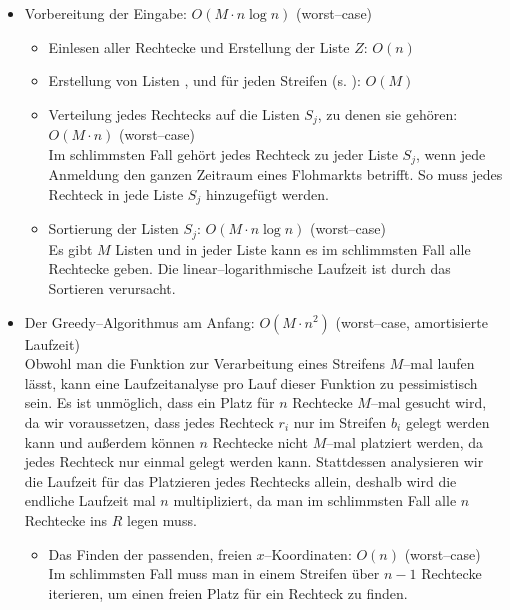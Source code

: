 \begin{itemize}
	\item Vorbereitung der Eingabe: $O(M \cdot n \log n)$ (worst--case)
	\begin{itemize}
		\item Einlesen aller Rechtecke und Erstellung der Liste $Z$: $O(n)$

		\item Erstellung von Listen ,  und 
		für jeden Streifen (s. ): $O(M)$

		\item Verteilung jedes Rechtecks auf die Listen $S_j$, zu denen sie gehören: $O(M \cdot n)$ (worst--case)\\
		Im schlimmsten Fall gehört jedes Rechteck zu jeder Liste $S_j$, wenn jede Anmeldung
		den ganzen Zeitraum eines Flohmarkts betrifft.
		So muss jedes Rechteck in jede Liste $S_j$ hinzugefügt werden.

		\item Sortierung der Listen $S_j$: $O(M \cdot n \log n)$ (worst--case)\\
		Es gibt $M$ Listen und in jeder Liste kann es im schlimmsten Fall
		alle Rechtecke geben. Die linear--logarithmische Laufzeit
		ist durch das Sortieren verursacht.
	\end{itemize}

	\item Der Greedy--Algorithmus am Anfang: $O(M \cdot n^2)$ (worst--case, amortisierte Laufzeit)\\
	Obwohl man die Funktion zur Verarbeitung eines Streifens $M$--mal 
	laufen lässt, kann eine Laufzeitanalyse pro Lauf dieser Funktion zu pessimistisch sein.
	Es ist unmöglich, dass ein Platz für $n$ Rechtecke $M$--mal gesucht wird,
	da wir voraussetzen, dass jedes Rechteck $r_i$ nur im Streifen $b_i$ gelegt werden kann
	und außerdem können $n$ Rechtecke nicht $M$--mal platziert werden, da jedes Rechteck
	nur einmal gelegt werden kann.
	Stattdessen analysieren wir die Laufzeit für das Platzieren jedes Rechtecks allein,
	deshalb wird die endliche Laufzeit mal $n$ multipliziert, da man im schlimmsten Fall
	alle $n$ Rechtecke ins $R$ legen muss.

	\begin{itemize}
		\item Das Finden der passenden, freien $x$--Koordinaten: $O(n)$ (worst--case)\\
		Im schlimmsten Fall muss man in einem Streifen über $n-1$ Rechtecke iterieren,
		um einen freien Platz für ein Rechteck zu finden.


\end{itemize}
\end{itemize}
